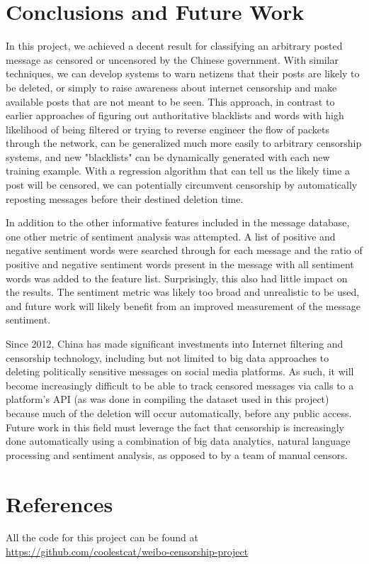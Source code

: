 \documentclass{article} %
\begin{document}
\begin{CJK*}{UTF8}{gbsn}
\section{Conclusions and Future Work}
In this project, we achieved a decent result for classifying an arbitrary posted message as censored or uncensored by the Chinese government. With similar techniques, we can develop systems to warn netizens that their posts are likely to be deleted, or simply to raise awareness about internet censorship and make available posts that are not meant to be seen. This approach, in contrast to earlier approaches of figuring out authoritative blacklists and words with high likelihood of being filtered or trying to reverse engineer the flow of packets through the network, can be generalized much more easily to arbitrary censorship systems, and new "blacklists" can be dynamically generated with each new training example. With a regression algorithm that can tell us the likely time a post will be censored, we can potentially circumvent censorship by automatically reposting messages before their destined deletion time.  

In addition to the other informative features included in the message database, one other metric of sentiment analysis was attempted. A list of positive and negative sentiment words were searched through for each message and the ratio of positive and negative sentiment words present in the message with all sentiment words was added to the feature list. Surprisingly, this also had little impact on the results. The sentiment metric was likely too broad and unrealistic to be used, and future work will likely benefit from an improved measurement of the message sentiment. 

Since 2012, China has made significant investments into Internet filtering and censorship technology, including but not limited to big data approaches to deleting politically sensitive messages on social media platforms. As such, it will become increasingly difficult to be able to track censored messages via calls to a platform's API (as was done in compiling the dataset used in this project) because much of the deletion will occur automatically, before any public access. Future work in this field must leverage the fact that censorship is increasingly done automatically using a combination of big data analytics, natural language processing and sentiment analysis, as opposed to by a team of manual censors. 

\section{References}
\begingroup
    \fontsize{7pt}{7pt}\selectfont
All the code for this project can be found at \url{https://github.com/coolestcat/weibo-censorship-project}


\end{CJK*}
\end{document}
